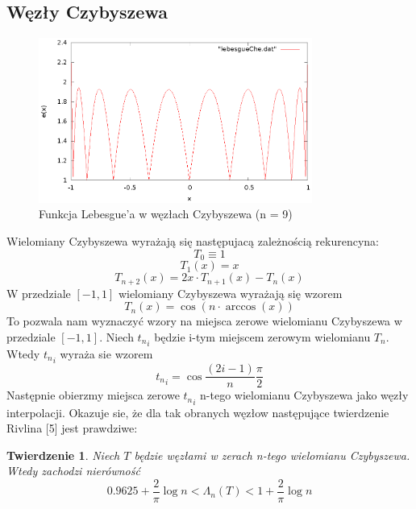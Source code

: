 \documentclass{article}
\newtheorem{twr}{Twierdzenie}
\begin{document}
\subsection{Węzły Czybyszewa}
\begin{figure}[H]
	\centering
    \includegraphics[width=0.8\textwidth]{wykresy/lebesgueChe.eps}
    \caption{Funkcja Lebesgue'a w węzłach Czybyszewa (n = 9)}
\end{figure}
Wielomiany Czybyszewa wyrażają się następujacą zależnością rekurencyna:
\begin{equation*}
T_0 \equiv 1
\end{equation*}
\begin{equation*}
T_1(x) = x
\end{equation*}
\begin{equation*}
T_{n+2}(x) = 2x \cdot T_{n+1}(x) - T_n(x)
\end{equation*}
W przedziale $[-1, 1]$ wielomiany Czybyszewa wyrażają się wzorem
\begin{equation*}
T_n(x) = \cos(n \cdot \arccos(x))
\end{equation*}
To pozwala nam wyznaczyć wzory na miejsca zerowe wielomianu Czybyszewa w przedziale $[-1, 1]$. Niech ${t_n}_i$ będzie i-tym miejscem zerowym wielomianu $T_n$. Wtedy ${t_n}_i$ wyraża sie wzorem
\begin{equation}
{t_n}_i = \cos \frac{(2i - 1)}{n} \frac{\pi}{2}
\end{equation}
Następnie obierzmy miejsca zerowe ${t_n}_i$ n-tego wielomianu Czybyszewa jako węzły interpolacji. Okazuje sie, że dla tak obranych węzłow następujące twierdzenie Rivlina [5] jest prawdziwe:
\begin{twr}
Niech $T$ będzie węzłami w zerach n-tego wielomianu Czybyszewa. Wtedy zachodzi nierówność
\begin{equation*}
0.9625 + \frac{2}{\pi}\log n < \Lambda_n(T) < 1 + \frac{2}{\pi} \log n
\end{equation*}
\end{twr}
\end{document}
